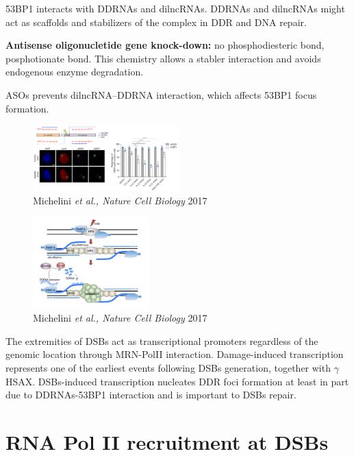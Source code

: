 53BP1 interacts with DDRNAs and dilncRNAs. DDRNAs and dilncRNAs might act as scaffolds and stabilizers of the complex in DDR and DNA repair.

\textbf{Antisense oligonucletide gene knock-down:} no phosphodiesteric bond, posphotionate bond. This chemistry allows a stabler interaction and avoids endogenous enzyme degradation. 

ASOs prevents dilncRNA--DDRNA interaction, which affects 53BP1 focus formation.

\begin{figure}
\centering
\includegraphics[width=0.5\textwidth]{Screen_Shot_2022-12-07_at_09-50-28.png}
\caption{Michelini \emph{et al., Nature Cell Biology} 2017}
\end{figure}

\begin{figure}
\centering
\includegraphics[width=0.4\textwidth]{Screen_Shot_2022-12-07_at_09-51-02.png}
\caption{Michelini \emph{et al., Nature Cell Biology} 2017}
\end{figure}

The extremities of DSBs act as transcriptional promoters regardless of the genomic location through MRN-PolII interaction. Damage-induced transcription represents one of the earliest events following DSBs generation, together with \(\gamma\)HSAX. DSBs-induced transcription nucleates DDR foci formation at least in part due to DDRNAs-53BP1 interaction and is important to DSBs repair.

\hypertarget{rna-pol-ii-recruitment-at-dsbs}{%
\section{RNA Pol II recruitment at DSBs}\label{rna-pol-ii-recruitment-at-dsbs}}


